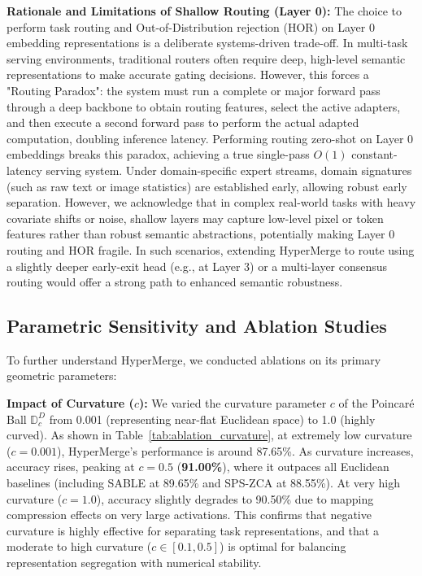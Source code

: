 \textbf{Rationale and Limitations of Shallow Routing (Layer 0):} The choice to perform task routing and Out-of-Distribution rejection (HOR) on Layer 0 embedding representations is a deliberate systems-driven trade-off. In multi-task serving environments, traditional routers often require deep, high-level semantic representations to make accurate gating decisions. However, this forces a "Routing Paradox": the system must run a complete or major forward pass through a deep backbone to obtain routing features, select the active adapters, and then execute a second forward pass to perform the actual adapted computation, doubling inference latency. Performing routing zero-shot on Layer 0 embeddings breaks this paradox, achieving a true single-pass $O(1)$ constant-latency serving system. Under domain-specific expert streams, domain signatures (such as raw text or image statistics) are established early, allowing robust early separation. However, we acknowledge that in complex real-world tasks with heavy covariate shifts or noise, shallow layers may capture low-level pixel or token features rather than robust semantic abstractions, potentially making Layer 0 routing and HOR fragile. In such scenarios, extending HyperMerge to route using a slightly deeper early-exit head (e.g., at Layer 3) or a multi-layer consensus routing would offer a strong path to enhanced semantic robustness.

\subsection{Parametric Sensitivity and Ablation Studies}
To further understand HyperMerge, we conducted ablations on its primary geometric parameters:

\textbf{Impact of Curvature ($c$):} We varied the curvature parameter $c$ of the Poincaré Ball $\mathbb{D}_c^D$ from 0.001 (representing near-flat Euclidean space) to 1.0 (highly curved). As shown in Table~\ref{tab:ablation_curvature}, at extremely low curvature ($c = 0.001$), HyperMerge's performance is around 87.65\%. As curvature increases, accuracy rises, peaking at $c = 0.5$ (\textbf{91.00\%}), where it outpaces all Euclidean baselines (including SABLE at 89.65\% and SPS-ZCA at 88.55\%). At very high curvature ($c = 1.0$), accuracy slightly degrades to 90.50\% due to mapping compression effects on very large activations. This confirms that negative curvature is highly effective for separating task representations, and that a moderate to high curvature ($c \in [0.1, 0.5]$) is optimal for balancing representation segregation with numerical stability.

